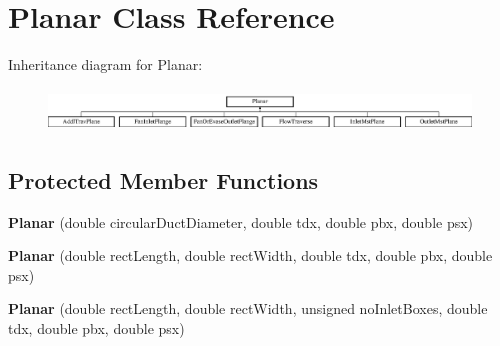 \hypertarget{class_planar}{}\section{Planar Class Reference}
\label{class_planar}
Inheritance diagram for Planar\+:\begin{figure}[H]
\begin{center}
\leavevmode
\includegraphics[height=1.138211cm]{d2/ddc/class_planar}
\end{center}
\end{figure}
\subsection*{Protected Member Functions}
\begin{DoxyCompactItemize}
\item 
\mbox{\label{class_planar_a3b5c2c6a72561a29012c7793211ce7e0}} 
{\bfseries Planar} (double circular\+Duct\+Diameter, double tdx, double pbx, double psx)
\item 
\mbox{\label{class_planar_ad51ee0c566e5a27c645f7ad04bc12411}} 
{\bfseries Planar} (double rect\+Length, double rect\+Width, double tdx, double pbx, double psx)
\item 
\mbox{\label{class_planar_aca18cb31140e41b9454a3712c5a11cf4}} 
{\bfseries Planar} (double rect\+Length, double rect\+Width, unsigned no\+Inlet\+Boxes, double tdx, double pbx, double psx)
\end{DoxyCompactItemize}
